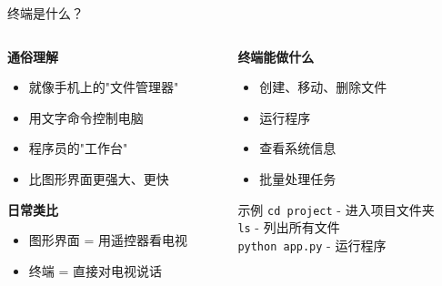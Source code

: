 \documentclass[aspectratio=169,xcolor=dvipsnames]{beamer}
\begin{document}
\begin{frame}{终端是什么？}
  \begin{columns}
    \begin{column}{0.48\textwidth}
      \textbf{通俗理解}
      \begin{itemize}
        \item 就像手机上的"文件管理器"
        \item 用文字命令控制电脑
        \item 程序员的"工作台"
        \item 比图形界面更强大、更快
      \end{itemize}

      \vspace{0.3cm}

      \textbf{日常类比}
      \begin{itemize}
        \item 图形界面 = 用遥控器看电视
        \item 终端 = 直接对电视说话
      \end{itemize}
    \end{column}
    \begin{column}{0.48\textwidth}
      \textbf{终端能做什么}
      \begin{itemize}
        \item 创建、移动、删除文件
        \item 运行程序
        \item 查看系统信息
        \item 批量处理任务
      \end{itemize}

      \vspace{0.3cm}

      \begin{exampleblock}{示例}
        \small
        \texttt{cd project} - 进入项目文件夹\\
        \texttt{ls} - 列出所有文件\\
        \texttt{python app.py} - 运行程序
      \end{exampleblock}
    \end{column}
  \end{columns}
\end{frame}
\end{document}

